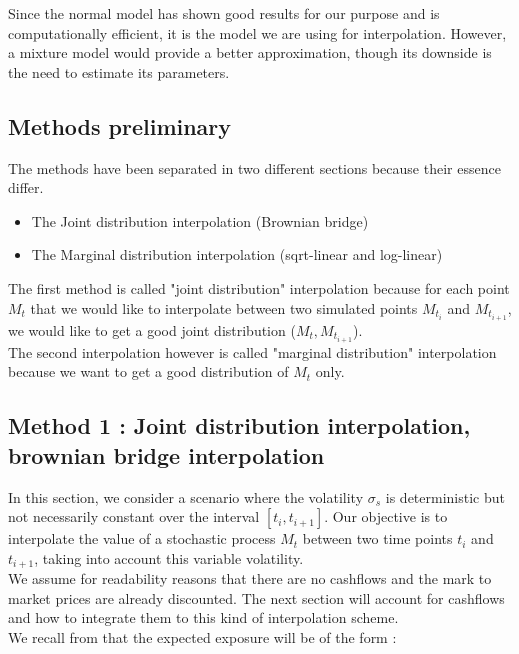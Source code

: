 \documentclass{article}
\begin{document}
Since the normal model has shown good results for our purpose and is computationally efficient, it is the model we are using for interpolation. However, a mixture model would provide a better approximation, though its downside is the need to estimate its parameters.


\subsection{Methods preliminary}

The methods have been separated in two different sections because their essence differ. 

\begin{itemize}
    \item The Joint distribution interpolation (Brownian bridge)
    \item The Marginal distribution interpolation (sqrt-linear and log-linear)
\end{itemize}

The first method is called "joint distribution" interpolation because for each point $M_t$ that we would like to interpolate between two simulated points $M_t_i$ and $M_{t_{i+1}}$, we would like to get a good joint distribution ($M_t, M_{t_{i+1}}$).\\

The second interpolation however is called "marginal distribution" interpolation because we want to get a good distribution of $M_t$ only.

\subsection{Method 1 : Joint distribution interpolation, brownian bridge interpolation}

In this section, we consider a scenario where the volatility $\sigma_s$ is deterministic but not necessarily constant over the interval $[t_i, t_{i+1}]$. Our objective is to interpolate the value of a stochastic process $M_t$ between two time points $t_i$ and $t_{i+1}$, taking into account this variable volatility.\\

We assume for readability reasons that there are no cashflows and the mark to market prices are already discounted. The next section will account for cashflows and how to integrate them to this kind of interpolation scheme.\\

We recall from \cite{andersen2016rethinking} that the expected exposure will be of the form :
\end{document}
